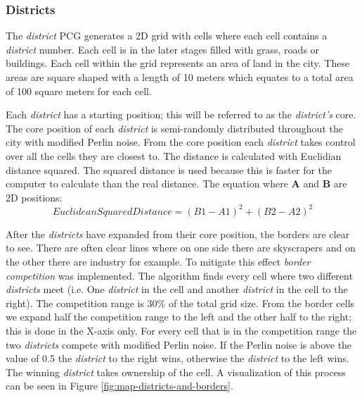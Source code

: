 	\subsubsection{Districts}
	The \textit{district} PCG generates a 2D grid with cells where each cell contains a \textit{district} number. Each cell is in the later stages filled with grass, roads or buildings. Each cell within the grid represents an area of land in the city. These areas are square shaped with a length of 10 meters which equates to a total area of 100 square meters for each cell.
		
	\par
	Each \textit{district} has a starting position; this will be referred to as the \textit{district's} core. The core position of each \textit{district} is semi-randomly distributed throughout the city with modified Perlin noise. From the core position each \textit{district} takes control over all the cells they are closest to. The distance is calculated with Euclidian distance squared. The squared distance is used because this is faster for the computer to calculate than the real distance. The equation where \textbf{A} and \textbf{B} are 2D positions:
	\begin{equation}
		EuclideanSquaredDistance = (B1 - A1)^2 + (B2 - A2)^2
	\end{equation}
		
	\par
	After the \textit{districts} have expanded from their core position, the borders are clear to see. There are often clear lines where on one side there are skyscrapers and on the other there are industry for example. To mitigate this effect \textit{border competition} was implemented. The algorithm finds every cell where two different \textit{districts} meet (i.e. One \textit{district} in the cell and another \textit{district} in the cell to the right). The competition range is 30\% of the total grid size. From the border cells we expand half the competition range to the left and the other half to the right; this is done in the X-axis only. For every cell that is in the competition range the two \textit{districts} compete with modified Perlin noise. If the Perlin noise is above the value of 0.5 the \textit{district} to the right wins, otherwise the \textit{district} to the left wins. The winning \textit{district} takes ownership of the cell. A visualization of this process can be seen in Figure \ref{fig:map-districts-and-borders}.
		
